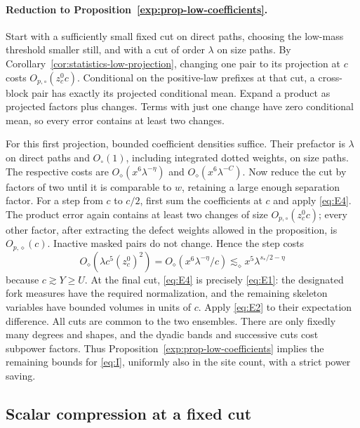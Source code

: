 \paragraph{Reduction to Proposition~\ref{exp:prop-low-coefficients}.}
Start with a sufficiently small fixed cut on direct paths, choosing
the low-mass threshold smaller still, and with a cut of order
\(\lambda\) on size paths. By
Corollary~\ref{cor:statistics-low-projection}, changing one pair to its
projection at \(c\) costs \(O_{p,\circ}(z_c^0c)\). Conditional on the
positive-law prefixes at that cut, a cross-block pair has exactly
its projected conditional mean. Expand a product as projected factors
plus changes. Terms with just one change have zero conditional mean,
so every error contains at least two changes.

For this first projection, bounded coefficient densities suffice.
Their prefactor is \(\lambda\) on direct paths and \(O_\circ(1)\),
including integrated dotted weights, on size paths. The respective
costs are \(O_\diamond(x^6\lambda^{-\eta})\) and
\(O_\diamond(x^6\lambda^{-C})\). Now reduce the cut by factors of two
until it is comparable to \(w\), retaining a large enough separation
factor. For a step from \(c\) to \(c/2\), first sum the coefficients
at \(c\) and apply \eqref{eq:E4}. The product error again contains at
least two changes of size \(O_{p,\circ}(z_c^0c)\); every other factor,
after extracting the defect weights allowed in the proposition, is
\(O_{p,\diamond}(c)\). Inactive masked pairs do not change. Hence the
step costs
\[
 O_\diamond(\lambda c^5(z_c^0)^2)
       =O_\diamond(x^6\lambda^{-\eta}/c)
       \lesssim_\diamond x^5\lambda^{s_*/2-\eta}
\]
because \(c\gtrsim Y\ge U\). At the final cut, \eqref{eq:E4} is
precisely \eqref{eq:E1}: the designated fork measures have the required
normalization, and the remaining skeleton variables have bounded
volumes in units of \(c\). Apply \eqref{eq:E2} to their expectation
difference. All cuts are common to the two ensembles. There are only
fixedly many degrees and shapes, and the dyadic bands and successive
cuts cost subpower factors. Thus Proposition~\ref{exp:prop-low-coefficients}
implies the remaining bounds for \eqref{eq:I}, uniformly also in the
site count, with a strict power saving.


\subsection{Scalar compression at a fixed cut}

